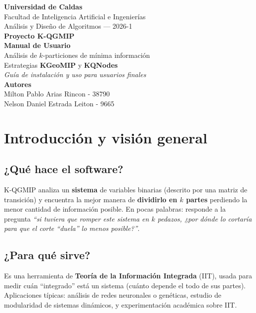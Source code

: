 \documentclass[11pt,letterpaper]{article}
\begin{document}
\begin{titlepage}
	\centering
	\vspace*{1.5cm}
	{\large\textbf{Universidad de Caldas}}\\[0.2cm]
	{\normalsize Facultad de Inteligencia Artificial e Ingenierías}\\[0.2cm]
	{\normalsize Análisis y Diseño de Algoritmos — 2026-1}\\[2.5cm]
	{\Huge\textbf{Proyecto K-QGMIP}}\\[0.6cm]
	{\LARGE\textbf{Manual de Usuario}}\\[0.4cm]
	{\large Análisis de $k$-particiones de mínima información}\\[0.3cm]
	{\large Estrategias \textbf{KGeoMIP} y \textbf{KQNodes}}\\[3cm]
	{\small\itshape Guía de instalación y uso para usuarios finales}\\[1.5cm]
	{\large\textbf{Autores}}\\[0.2cm]
	{\normalsize Milton Pablo Arias Rincon - 38790}\\[0.1cm]
	{\normalsize Nelson Daniel Estrada Leiton - 9665}\\[1.5cm]
	{\small \mesano}
	\vfill
\end{titlepage}

\tableofcontents
\newpage

\section{Introducción y visión general}

\subsection{¿Qué hace el software?}
K-QGMIP analiza un \textbf{sistema} de variables binarias (descrito por una matriz
de transición) y encuentra la mejor manera de \textbf{dividirlo en $k$ partes}
perdiendo la menor cantidad de información posible. En pocas palabras: responde a
la pregunta \emph{``si tuviera que romper este sistema en $k$ pedazos, ¿por dónde
	lo cortaría para que el corte ``duela'' lo menos posible?''}.

\subsection{¿Para qué sirve?}
Es una herramienta de \textbf{Teoría de la Información Integrada} (IIT), usada para
medir cuán ``integrado'' está un sistema (cuánto depende el todo de sus partes).
Aplicaciones típicas: análisis de redes neuronales o genéticas, estudio de
modularidad de sistemas dinámicos, y experimentación académica sobre IIT.
\end{document}
